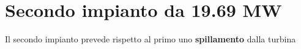 \section{Secondo impianto da 19.69 MW}
Il secondo impianto prevede rispetto al primo uno \textbf{spillamento} dalla turbina 
